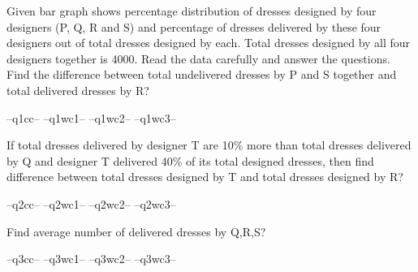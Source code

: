 \question   Given bar graph shows percentage distribution of dresses designed by four designers (P, Q, R and S) and percentage of dresses delivered by these four designers out of total dresses designed by each.  Total dresses designed by all four designers together is 4000. Read the data carefully and answer the questions.  Find the difference between total undelivered dresses by P and S together and total delivered dresses by R?

    
\begin{randomizechoices}
\correctchoice --q1cc-- 
\choice --q1wc1--  
\choice --q1wc2-- 
\choice --q1wc3-- 
\end{randomizechoices}

\question   If total dresses delivered by designer T are 10\% more than total dresses delivered by Q and designer T delivered 40\% of its total designed dresses, then find difference between total dresses designed by T and total dresses designed by R?

\begin{randomizechoices}
\correctchoice --q2cc-- 
\choice --q2wc1--  
\choice --q2wc2-- 
\choice --q2wc3-- 
\end{randomizechoices}

\question   Find average number of delivered dresses by Q,R,S?

\begin{randomizechoices}
\correctchoice --q3cc-- 
\choice --q3wc1--  
\choice --q3wc2-- 
\choice --q3wc3-- 
\end{randomizechoices}

